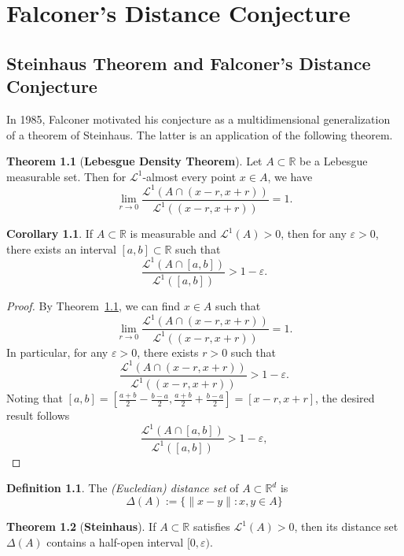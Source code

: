 \documentclass[12pt,a4paper]{report}
\theoremstyle{definition}
\newtheorem{theorem}{Theorem}
\newtheorem{definition}{Definition}
\newtheorem{corollary}{Corollary}
\begin{document}
\chapter{Falconer's Distance Conjecture}
\section{Steinhaus Theorem and Falconer's Distance Conjecture}
In 1985, Falconer motivated his conjecture as a multidimensional generalization of a theorem of Steinhaus. The latter is an application of the following theorem.

\begin{theorem}[\textbf{Lebesgue Density Theorem}] \label{LDT}
Let \( A \subset \mathbb{R} \) be a Lebesgue measurable set. Then for \( \mathcal{L}^1 \)-almost every point \( x \in A \), we have
\[
\lim_{r \to 0} \frac{\mathcal{L}^1(A \cap (x - r, x + r))}{\mathcal{L}^1((x - r, x + r))} = 1.
\]
\end{theorem}

\begin{corollary} \label{cor2}
If \( A \subset \mathbb{R} \) is measurable and \( \mathcal{L}^1(A) > 0 \), then for any \( \varepsilon > 0 \), there exists an interval \( [a,b] \subset \mathbb{R} \) such that
\[
\frac{\mathcal{L}^1(A \cap [a,b])}{\mathcal{L}^1([a,b])} > 1 - \varepsilon.
\]
\end{corollary}

\begin{proof}
By Theorem~\ref{LDT}, we can find \( x \in A \) such that
\[
\lim_{r \to 0} \frac{\mathcal{L}^1(A \cap (x - r, x + r))}{\mathcal{L}^1((x - r, x + r))} = 1.
\]
In particular, for any \( \varepsilon > 0 \), there exists \( r > 0 \) such that
\[
\frac{\mathcal{L}^1(A \cap (x - r, x + r))}{\mathcal{L}^1((x - r, x + r))} > 1 - \varepsilon.
\]
Noting that \([a,b] = [\frac{a+b}{2} - \frac{b-a}{2}, \frac{a+b}{2} + \frac{b-a}{2}] = [x - r, x + r]\), the desired result follows
\[
\frac{\mathcal{L}^1(A \cap [a,b])}{\mathcal{L}^1([a,b])} > 1 - \varepsilon,
\]
\end{proof}

\begin{definition}
The \textit{(Eucledian) distance set} of $A \subset \mathbb{R}^d$ is
\[
\Delta(A) := \{ \|x - y\| : x, y \in A \}
\]
\end{definition}

\begin{theorem}[\textbf{Steinhaus}] \label{steinhaus}
If \( A \subset \mathbb{R} \) satisfies $\mathcal{L}^1(A) >0$, then its distance set $\Delta(A)$ contains a half-open interval \([0, \varepsilon)\).
\end{theorem}
\end{document}

